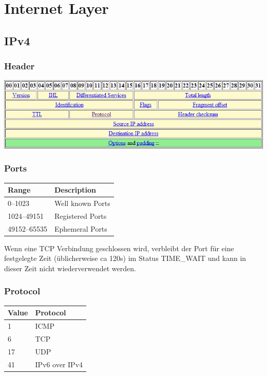 \section{Internet Layer}


\subsection{IPv4}

\subsubsection{Header}

\includegraphics[width=\textwidth]{media/ipv4_header.png}

\subsubsection{Ports}

\begin{tabular}[h]{|l|l|}
	\hline
  \textbf{Range} & \textbf{Description} \\
	\hline
  0--1023 & Well known Ports \\
  1024--49151 & Registered Ports\\
  49152--65535 & Ephemeral Ports\\
	\hline
\end{tabular}

Wenn eine TCP Verbindung geschlossen wird, verbleibt der Port für eine
festgelegte Zeit (üblicherweise ca 120s) im Status TIME\_WAIT und kann in dieser
Zeit nicht wiederverwendet werden.

\subsubsection{Protocol}

\begin{tabular}[h]{|l|l|}
	\hline
  \textbf{Value} & \textbf{Protocol} \\
	\hline
  1 & ICMP \\
  6 & TCP \\
  17 & UDP \\
  41 & IPv6 over IPv4 \\
	\hline
\end{tabular}

